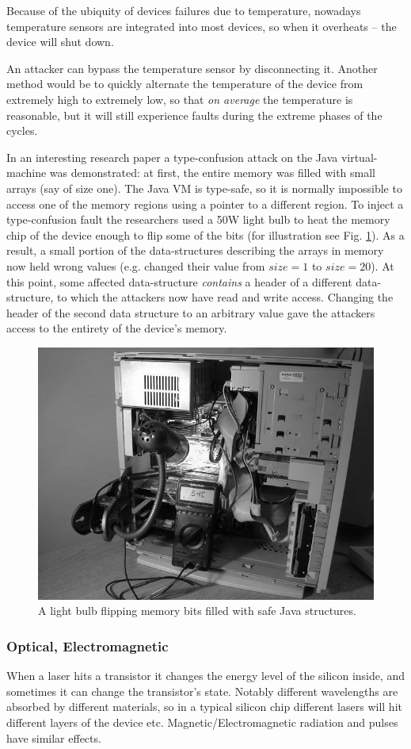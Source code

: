 Because of the ubiquity of devices failures due to temperature, nowadays temperature sensors are integrated into most devices, so when it overheats -- the device will shut down.

An attacker can bypass the temperature sensor by disconnecting it. Another method would be to quickly alternate the temperature of the device from extremely high to extremely low, so that \emph{on average} the temperature is reasonable, but it will still experience faults during the extreme phases of the cycles.

In an interesting research paper \cite{appel} a type-confusion attack on the Java virtual-machine was demonstrated: at first, the entire memory was filled with small arrays (say of size one). The Java VM is type-safe, so it is normally impossible to access one of the memory regions using a pointer to a different region. To inject a type-confusion fault the researchers used a 50W light bulb to heat the memory chip of the device enough to flip some of the bits (for illustration see Fig. \ref{fig:memory_lightbulb}). As a result, a small portion of the data-structures describing the arrays in memory now held wrong values (e.g. changed their value from $size=1$ to $size=20$). At this point, some affected data-structure \emph{contains} a header of a different data-structure, to which the attackers now have read and write access. Changing the header of the second data structure to an arbitrary value gave the attackers access to the entirety of the device's memory.
\begin{figure}[!ht]
	\centering
	\includegraphics[width=0.7\linewidth]{images/ch9/bulb.png}
	\caption{A light bulb flipping memory bits filled with safe Java structures.}
	\label{fig:memory_lightbulb}
\end{figure}

\subsubsection{Optical, Electromagnetic}
When a laser hits a transistor it changes the energy level of the silicon inside, and sometimes it can change the transistor's state. Notably different wavelengths are absorbed by different materials, so in a typical silicon chip different lasers will hit different layers of the device etc. Magnetic/Electromagnetic radiation and pulses have similar effects.

